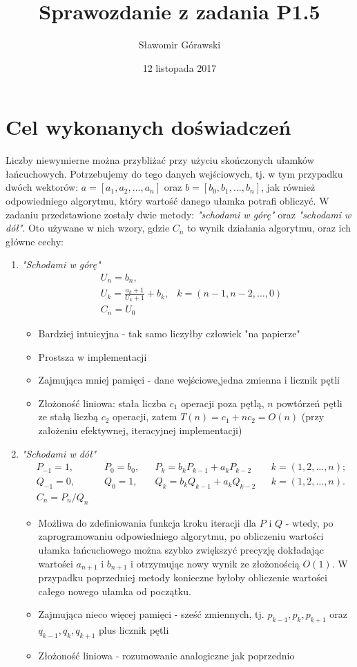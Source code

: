 \documentclass{article}
\title{Sprawozdanie z zadania P1.5}
\author{Sławomir Górawski}
\date{12 listopada 2017}
\begin{document}
\maketitle

\section{Cel wykonanych doświadczeń}

Liczby niewymierne można przybliżać przy użyciu skończonych ułamków łańcuchowych. Potrzebujemy do tego danych wejściowych, tj. w tym przypadku dwóch wektorów: $a=[a_1, a_2, ..., a_n]$ oraz $b=[b_0, b_1, ..., b_n]$, jak również odpowiedniego algorytmu, który wartość danego ułamka potrafi obliczyć. W zadaniu przedstawione zostały dwie metody: \textit{"schodami w górę"} oraz \textit{"schodami w dół"}. Oto używane w nich wzory, gdzie $C_n$ to wynik działania algorytmu, oraz ich główne cechy:

\begin{enumerate}
\item \textit{"Schodami w górę"}
\begin{align*}
&U_n=b_n,\\
&U_k=\frac{a_k+1}{U_k+1}+b_k, & k=(n-1,n-2,\ldots,0)\\
&C_n=U_0
\end{align*}
\begin{itemize}
\item Bardziej intuicyjna - tak samo liczyłby człowiek "na papierze"
\item Prostsza w implementacji
\item Zajmująca mniej pamięci - dane wejściowe,jedna zmienna i licznik pętli
\item Złożoność liniowa: stała liczba $c_1$ operacji poza pętlą, $n$ powtórzeń pętli ze stałą liczbą $c_2$ operacji, zatem $T(n)=c_1+nc_2=O(n)$ (przy założeniu efektywnej, iteracyjnej implementacji)
\end{itemize}
\item \textit{"Schodami w dół"}
\begin{align*}
    &P_{-1}=1, & &P_0=b_0, & &P_k=b_k P_{k-1} + a_k P_{k-2} & &k=(1,2,\ldots,n);\\
    &Q_{-1}=0, & &Q_0=1, & &Q_k=b_k Q_{k-1} + a_k Q_{k-2} & &k=(1,2,\ldots,n).\\
    &C_n=P_n/Q_n
\end{align*}
\begin{itemize}
\item Możliwa do zdefiniowania funkcja kroku iteracji dla $P$ i $Q$ - wtedy, po zaprogramowaniu odpowiedniego algorytmu, po obliczeniu wartości ułamka łańcuchowego można szybko zwiększyć precyzję dokładając wartości $a_{n+1}$ i $b_{n+1}$ i otrzymując nowy wynik ze złożonością $O(1)$. W przypadku poprzedniej metody konieczne byłoby obliczenie wartości całego nowego ułamka od początku.
\item Zajmująca nieco więcej pamięci - sześć zmiennych, tj. $p_{k-1}, p_k, p_{k+1}$ oraz $q_{k-1}, q_k, q_{k+1}$ plus licznik pętli
\item Złożoność liniowa - rozumowanie analogiczne jak poprzednio
\end{itemize}
\end{enumerate}
\end{document}
